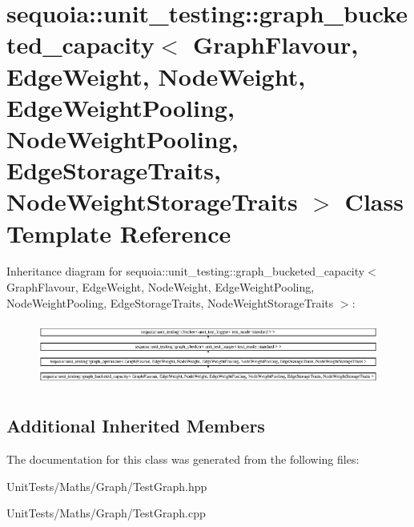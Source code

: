 \hypertarget{classsequoia_1_1unit__testing_1_1graph__bucketed__capacity}{}\section{sequoia\+::unit\+\_\+testing\+::graph\+\_\+bucketed\+\_\+capacity$<$ Graph\+Flavour, Edge\+Weight, Node\+Weight, Edge\+Weight\+Pooling, Node\+Weight\+Pooling, Edge\+Storage\+Traits, Node\+Weight\+Storage\+Traits $>$ Class Template Reference}
\label{classsequoia_1_1unit__testing_1_1graph__bucketed__capacity}
Inheritance diagram for sequoia\+::unit\+\_\+testing\+::graph\+\_\+bucketed\+\_\+capacity$<$ Graph\+Flavour, Edge\+Weight, Node\+Weight, Edge\+Weight\+Pooling, Node\+Weight\+Pooling, Edge\+Storage\+Traits, Node\+Weight\+Storage\+Traits $>$\+:\begin{figure}[H]
\begin{center}
\leavevmode
\includegraphics[height=2.149712cm]{classsequoia_1_1unit__testing_1_1graph__bucketed__capacity}
\end{center}
\end{figure}
\subsection*{Additional Inherited Members}


The documentation for this class was generated from the following files\+:\begin{DoxyCompactItemize}
\item 
Unit\+Tests/\+Maths/\+Graph/Test\+Graph.\+hpp\item 
Unit\+Tests/\+Maths/\+Graph/Test\+Graph.\+cpp\end{DoxyCompactItemize}
